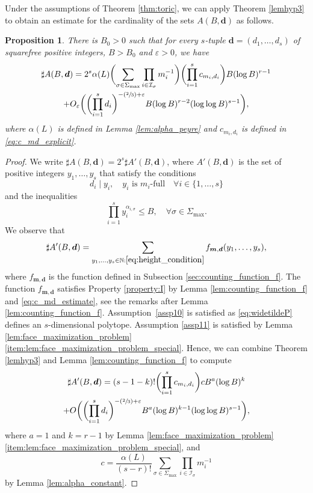 \documentclass[JEP,XML,SOM,Unicode,published]{cedram}
\let\epsilon\varepsilon
\newcommand{\Psfrac}[2]{(\sfrac{#1}{#2})}
\newcommand{\bfm}{{\boldsymbol{m}}}
\newcommand{\bfd}{\boldsymbol{d}}
\newcommand\NN{\mathbb{N}}
\newcommand{\ic}[1]{\mathcal{I}_{#1}}
\newtheorem{prop}[theorem]{Proposition}
\theoremstyle{definition}
\numberwithin{theorem}{section}
\begin{document}
Under the assumptions of Theorem \ref{thm:toric}, we can apply Theorem \ref{lemhyp3}
to obtain an estimate for the cardinality of the sets $A(B,\bfd)$ as follows.
\begin{prop}
\label{prop:A(B,d)}
There is $B_0>0$ such that for every $s$-tuple $\bfd=(d_1,\dots, d_s)$
of squarefree positive integers, $B>B_0$ and $\epsilon>0$, we have
\begin{multline*}
\sharp A(B,\bfd)= 2^s
\alpha(L)
\biggl(\sum_{\sigma\in\Sigma_{\max}}\prod_{i\in\ic{\sigma}}m_i^{-1}\biggr)
\biggl(\prod_{i=1}^sc_{m_i,d_i}\biggr) B (\log B)^{r-1}
\\+O_{\varepsilon}\biggl(
\biggl(\prod_{i=1}^s d_i\biggr)^{-\Psfrac23+\varepsilon} B (\log B)^{r-2}(\log\log B)^{s-1}
\biggr),
\end{multline*}
where $\alpha(L)$ is defined in Lemma \ref{lem:alpha_peyre} and $c_{m_i,d_i}$
is defined in \eqref{eq:c_md_explicit}.
\end{prop}
\begin{proof}
We write $\sharp A(B,\bfd) = 2^{s}\sharp A'(B,\bfd)$, where
$A'(B,\bfd)$ is the set of positive integers $y_1,\dots,y_s$ that satisfy the conditions
\[
d_i \mid y_i, \quad y_i \text{ is $m_i$-full} \quad\forall i \in\{1,\dots,s\}
\]
and the inequalities
\begin{equation}
\label{eq:height_condition}
\prod_{i=1}^s y_i^{\alpha_{i,\sigma}} \leq B, \quad \forall \sigma\in\Sigma_{\max}.
\end{equation}
We observe that
\[
\sharp A'(B,\bfd)=
\sum_{ y_1,\dots, y_s\in\NN : \eqref{eq:height_condition} }
f_{\bfm, \bfd}(y_1,\dots,y_s),
\]
where $f_{\bfm, \bfd}$ is the function defined in Subsection \ref{sec:counting_function_f}.
The function $f_{\bfm, \bfd}$ satisfies Property \ref{property:I} by Lemma \ref{lem:counting_function_f} and \eqref{eq:c_md_estimate},
see the remarks after Lemma \ref{lem:counting_function_f}.
Assumption~\ref{assp10} is satisfied as \eqref{eq:widetildeP} defines an $s$-dimensional polytope.
Assumption \ref{assp11} is satisfied
by Lemma \ref{lem:face_maximization_problem}\eqref{item:lem:face_maximization_problem_special}.
Hence, we can combine Theorem \ref{lemhyp3} and Lemma \ref{lem:counting_function_f} to compute
\begin{multline}
\sharp A'(B,\bfd)= (s-1-k)! \biggl(\prod_{i=1}^sc_{m_i,d_i}\biggr) c B^{a}(\log B)^k
\\+O\biggl(
\biggl(\prod_{i=1}^s d_i\biggr)^{-\Psfrac23+\varepsilon} B^{a}(\log B)^{k-1}(\log\log B)^{s-1}
\biggr),
\end{multline}
where $a=1$ and $k=r-1$ by
Lemma \ref{lem:face_maximization_problem}\eqref{item:lem:face_maximization_problem_special}, and
\[
c=\frac{\alpha(L)}{(s-r)!}\sum_{\sigma\in\Sigma_{\max}}\prod_{i\in\ic{\sigma}}m_i^{-1}
\]
by Lemma \ref{lem:alpha_constant}.
\end{proof}
\end{document}
